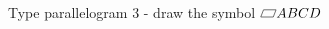 \documentclass{article}
\begin{document}
\begin{example*}{Type parallelogram 3 - draw the symbol}
  \newcommand\parallelogram{%
    \mathord{\text{%
      \tikz[baseline] 
        \draw ( 0em, .1ex)  -- ++( .9em, 0ex) -- 
            ++(.2em, 1.2ex) -- ++(-.9em, 0ex) -- cycle;}}}
  $\parallelogram ABCD$
\end{example*}
\end{document}

